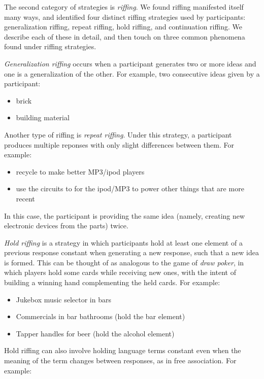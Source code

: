 The second category of strategies is \emph{riffing}.
We found riffing manifested itself many ways, and identified four distinct riffing strategies used by participants: generalization riffing, repeat riffing, hold riffing, and continuation riffing. We describe each of these in detail, and then touch on three common phenomena found under riffing strategies.

\emph{Generalization riffing} occurs when a participant generates two or more ideas and one is a generalization of the other. For example, two consecutive ideas given by a participant:

\begin{itemize}
    \item brick
    \item building material
\end{itemize}

Another type of riffing is \emph{repeat riffing}. Under this strategy, a participant produces multiple reponses with only slight differences between them. For example:

\begin{itemize}
    \item recycle to make better MP3/ipod players
    \item use the circuits to for the ipod/MP3 to power other things that are more recent
\end{itemize}

In this case, the participant is providing the same idea (namely, creating new electronic devices from the parts) twice.

\emph{Hold riffing} is a strategy in which participants hold at least one element of a previous response constant when generating a new response, such that a new idea is formed. This can be thought of as analogous to the game of \emph{draw poker}, in which players hold some cards while receiving new ones, with the intent of building a winning hand complementing the held cards.
For example:

\begin{itemize}
    \item Jukebox music selector in bars
    \item Commercials in bar bathrooms (hold the bar element)
    \item Tapper handles for beer (hold the alcohol element)
\end{itemize}

Hold riffing can also involve holding language terms constant even when the meaning of the term changes between responses, as in free association. For example:

